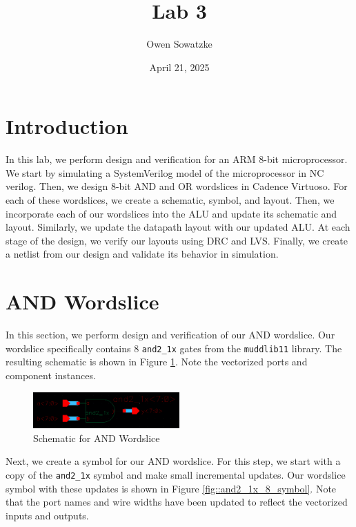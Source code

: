 \documentclass{article}
\title{Lab 3}
\author{Owen Sowatzke}
\date{April 21, 2025}
\newcommand{\zerodisplayskip}{
	\setlength{\abovedisplayskip}{0pt}%
	\setlength{\belowdisplayskip}{0pt}%
	\setlength{\abovedisplayshortskip}{0pt}%
	\setlength{\belowdisplayshortskip}{0pt}%
	\setlength{\mathindent}{0pt}}
\begin{document}
	\maketitle
	
	\section{Introduction}
	
	In this lab, we perform design and verification for an ARM 8-bit microprocessor. We start by simulating a SystemVerilog model of the microprocessor in NC verilog. Then, we design 8-bit AND and OR wordslices in Cadence Virtuoso. For each of these wordslices, we create a schematic, symbol, and layout. Then, we incorporate each of our wordslices into the ALU and update its schematic and layout. Similarly, we update the datapath layout with our updated ALU. At each stage of the design, we verify our layouts using DRC and LVS. Finally, we create a netlist from our design and validate its behavior in simulation. 
	
	\section{AND Wordslice}
	\label{section::and_wordslice}
	
	In this section, we perform design and verification of our AND wordslice. Our wordslice specifically contains 8 \texttt{and2\_1x} gates from the \texttt{muddlib11} library. The resulting schematic is shown in Figure \ref{fig::and2_1x_8_schematic}. Note the vectorized ports and component instances.
	
	\begin{figure}[H]
		\centerline{\includegraphics[width=0.5\textwidth]{and2_1x_8_schematic.png}}
		\caption{Schematic for AND Wordslice}
		\label{fig::and2_1x_8_schematic}
	\end{figure}
	
	\noindent Next, we create a symbol for our AND wordslice. For this step, we start with a copy of the \texttt{and2\_1x} symbol and make small incremental updates. Our wordslice symbol with these updates is shown in Figure \ref{fig::and2_1x_8_symbol}. Note that the port names and wire widths have been updated to reflect the vectorized inputs and outputs.
	
\end{document}

